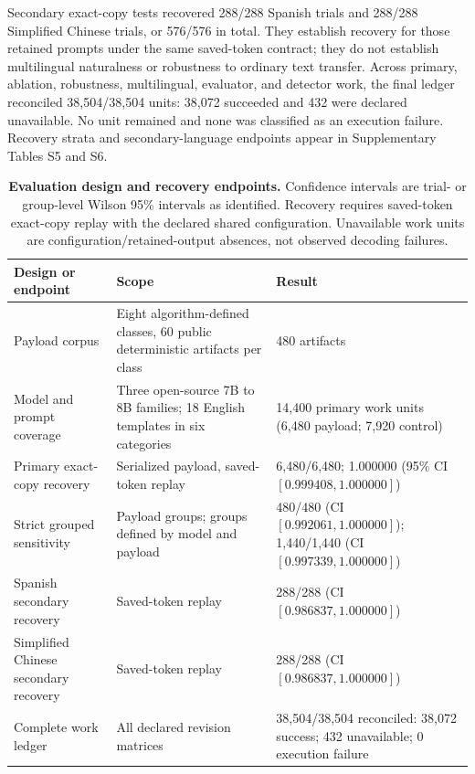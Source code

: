 \documentclass[fleqn,10pt]{wlscirep}
\begin{document}
Secondary exact-copy tests recovered 288/288 Spanish trials and 288/288 Simplified Chinese trials, or 576/576 in total. They establish recovery for those retained prompts under the same saved-token contract; they do not establish multilingual naturalness or robustness to ordinary text transfer. Across primary, ablation, robustness, multilingual, evaluator, and detector work, the final ledger reconciled 38,504/38,504 units: 38,072 succeeded and 432 were declared unavailable. No unit remained and none was classified as an execution failure. Recovery strata and secondary-language endpoints appear in Supplementary Tables S5 and S6.

\begin{table}[H]
\centering
\small
\begin{tabularx}{\textwidth}{L{0.25\textwidth}Y L{0.24\textwidth}}
\toprule
Design or endpoint & Scope & Result \\
\midrule
Payload corpus & Eight algorithm-defined classes, 60 public deterministic artifacts per class & 480 artifacts \\
Model and prompt coverage & Three open-source 7B to 8B families; 18 English templates in six categories & 14,400 primary work units (6,480 payload; 7,920 control) \\
Primary exact-copy recovery & Serialized payload, saved-token replay & 6,480/6,480; 1.000000 (95\% CI \([0.999408, 1.000000]\)) \\
Strict grouped sensitivity & Payload groups; groups defined by model and payload & 480/480 (CI \([0.992061, 1.000000]\)); 1,440/1,440 (CI \([0.997339, 1.000000]\)) \\
Spanish secondary recovery & Saved-token replay & 288/288 (CI \([0.986837, 1.000000]\)) \\
Simplified Chinese secondary recovery & Saved-token replay & 288/288 (CI \([0.986837, 1.000000]\)) \\
Complete work ledger & All declared revision matrices & 38,504/38,504 reconciled: 38,072 success; 432 unavailable; 0 execution failure \\
\bottomrule
\end{tabularx}
\caption{\label{tab:design-recovery}\textbf{Evaluation design and recovery endpoints.} Confidence intervals are trial- or group-level Wilson 95\% intervals as identified. Recovery requires saved-token exact-copy replay with the declared shared configuration. Unavailable work units are configuration/retained-output absences, not observed decoding failures.}
\end{table}
\end{document}
